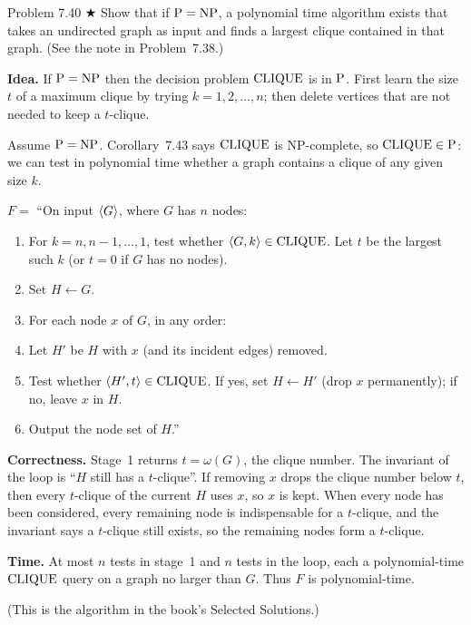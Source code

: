 \begin{question}{Problem 7.40 $\bigstar$}
Show that if $\mathrm{P}=\mathrm{NP}$, a polynomial time algorithm exists that takes an undirected graph as input and finds a largest clique contained in that graph. (See the note in Problem~7.38.)
\end{question}
\begin{soln}
\textbf{Idea.} If $\mathrm{P}=\mathrm{NP}$ then the decision problem $\mathrm{CLIQUE}$ is in $\mathrm{P}$. First learn the size $t$ of a maximum clique by trying $k=1,2,\ldots,n$; then delete vertices that are not needed to keep a $t$-clique.

Assume $\mathrm{P}=\mathrm{NP}$. Corollary~7.43 says $\mathrm{CLIQUE}$ is NP-complete, so $\mathrm{CLIQUE}\in\mathrm{P}$: we can test in polynomial time whether a graph contains a clique of any given size $k$.

$F=$ ``On input $\langle G\rangle$, where $G$ has $n$ nodes:
\begin{enumerate}
\item For $k=n,n-1,\ldots,1$, test whether $\langle G,k\rangle\in\mathrm{CLIQUE}$. Let $t$ be the largest such $k$ (or $t=0$ if $G$ has no nodes).
\item Set $H\leftarrow G$.
\item For each node $x$ of $G$, in any order:
\item \quad Let $H'$ be $H$ with $x$ (and its incident edges) removed.
\item \quad Test whether $\langle H',t\rangle\in\mathrm{CLIQUE}$. If yes, set $H\leftarrow H'$ (drop $x$ permanently); if no, leave $x$ in $H$.
\item Output the node set of $H$.''
\end{enumerate}

\textbf{Correctness.}
Stage~1 returns $t=\omega(G)$, the clique number. The invariant of the loop is ``$H$ still has a $t$-clique''. If removing $x$ drops the clique number below $t$, then every $t$-clique of the current $H$ uses $x$, so $x$ is kept. When every node has been considered, every remaining node is indispensable for a $t$-clique, and the invariant says a $t$-clique still exists, so the remaining nodes form a $t$-clique.

\textbf{Time.}
At most $n$ tests in stage~1 and $n$ tests in the loop, each a polynomial-time $\mathrm{CLIQUE}$ query on a graph no larger than $G$. Thus $F$ is polynomial-time.

(This is the algorithm in the book's Selected Solutions.)
\end{soln}

